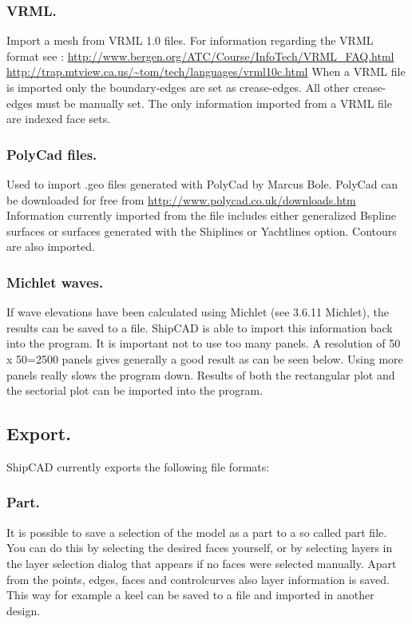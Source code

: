 \documentclass[12pt]{article}
\begin{document}
\subsubsection{VRML.}
Import a mesh from VRML 1.0 files. For information regarding the VRML format see :
\url{http://www.bergen.org/ATC/Course/InfoTech/VRML_FAQ.html}
\url{http://trap.mtview.ca.us/~tom/tech/languages/vrml10c.html}
When a VRML file is imported only the boundary-edges are set as crease-edges. All other crease-
edges must be manually set. The only information imported from a VRML file are indexed face sets.

\subsubsection{PolyCad files.}
Used to import .geo files generated with PolyCad by Marcus Bole. PolyCad can be downloaded for
free from \url{http://www.polycad.co.uk/downloads.htm} Information currently imported from the file
includes either generalized Bspline surfaces or surfaces generated with the Shiplines or Yachtlines
option. Contours are also imported.

\subsubsection{Michlet waves.}
If wave elevations have been calculated using Michlet (see 3.6.11 Michlet), the results can be saved
to a file. ShipCAD is able to import this information back into the program. It is important not to use
too many panels. A resolution of 50 x 50=2500 panels gives generally a good result as can be seen
below. Using more panels really slows the program down. Results of both the rectangular plot and
the sectorial plot can be imported into the program.

\subsection{Export.}
ShipCAD currently exports the following file formats:

\subsubsection{Part.}
It is possible to save a selection of the model as a part to a so called part file. You can do this by
selecting the desired faces yourself, or by selecting layers in the layer selection dialog that appears
if no faces were selected manually. Apart from the points, edges, faces and controlcurves also layer
information is saved. This way for example a keel can be saved to a file and imported in another
design.
\end{document}
